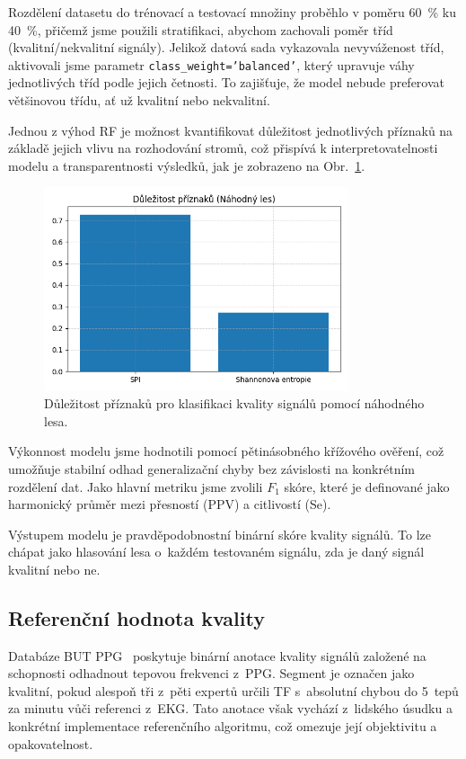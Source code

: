 Rozdělení datasetu do trénovací a testovací množiny proběhlo v poměru 60~\% ku 40~\%, přičemž jsme použili stratifikaci, abychom zachovali poměr tříd (kvalitní/nekvalitní signály).
Jelikož datová sada vykazovala nevyváženost tříd, aktivovali jsme parametr \texttt{class\_weight='balanced'}, který upravuje váhy jednotlivých tříd podle jejich četnosti.
To zajišťuje, že model nebude preferovat většinovou třídu, ať už kvalitní nebo nekvalitní.

Jednou z výhod \acs{RF} je možnost kvantifikovat důležitost jednotlivých příznaků na základě jejich vlivu na rozhodování stromů, což přispívá k interpretovatelnosti modelu a transparentnosti výsledků, jak je zobrazeno na Obr.~\ref{fig:hjorth_feature_importance}.

\begin{figure}[ht]
	\centering
	\includegraphics[width=0.8\textwidth]{./obrazky/quality/feature_importance.png}
	\caption[Důležitost příznaků pro klasifikaci kvality signálů pomocí náhodného lesa]{Důležitost příznaků pro klasifikaci kvality signálů pomocí náhodného lesa.}
	\label{fig:hjorth_feature_importance}
\end{figure}

Výkonnost modelu jsme hodnotili pomocí pětinásobného křížového ověření, což umožňuje stabilní odhad generalizační chyby bez závislosti na konkrétním rozdělení dat.
Jako hlavní metriku jsme zvolili $F_1$ skóre, které je definované jako harmonický průměr mezi přesností (\acs{PPV}) a citlivostí (\acs{Se}).

Výstupem modelu je pravděpodobnostní binární skóre kvality signálů.
To lze chápat jako hlasování lesa o~každém testovaném signálu, zda je daný signál kvalitní nebo ne.

\subsection*{Referenční hodnota kvality}
\label{subsec:referencni_hodnota_kvality}
Databáze \acs{BUT PPG}~\cite{BUT_PPG,BUT_PPG_database} poskytuje binární anotace kvality signálů založené na schopnosti odhadnout tepovou frekvenci z~\acs{PPG}.
Segment je označen jako kvalitní, pokud alespoň tři z~pěti expertů určili \acs{TF} s~absolutní chybou do 5~tepů za minutu vůči referenci z~\acs{EKG}.
Tato anotace však vychází z~lidského úsudku a konkrétní implementace referenčního algoritmu, což omezuje její objektivitu a opakovatelnost.

